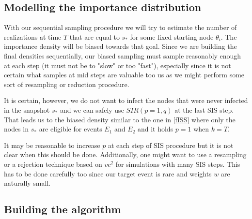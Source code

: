 \documentclass[times, utf8, diplomski]{fer}
\begin{document}
\subsection{Modelling the importance distribution}
With our sequential sampling procedure we will try to estimate the number of realizations at time $T$ that are equal to $s_*$ for some fixed starting node $\theta_i$. The importance density will be biased towards that goal. Since we are building the final densities sequentially, our biased sampling must sample reasonably enough at each step (it must not be to "slow" or too "fast"), especially since it is not certain what samples at mid steps are valuable too us as we might perform some sort of  resampling or reduction procedure.

It is certain, however, we do not want to infect the nodes that were never infected in the snapshot $s_*$ and we can safely use $SIR(p = 1, q)$ at the last SIS step. That leads us to the biased density similar to the one in \ref{fISS} where only the nodes in $s_*$ are eligible for events $E_1$ and $E_2$ and it holds $p = 1$ when $k = T$.

It may be reasonable to increase $p$ at each step of SIS procedure but it is not clear when this should be done. Additionally, one might want to use a resampling or a rejection technique based on $vc^2$ for simulations with many  SIS steps. This has to be done carefully too since our target event is rare and weights $w$ are naturally small.

\subsection{Building the algorithm}
%
%
%
\end{document}
